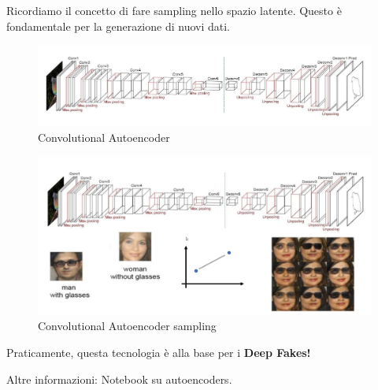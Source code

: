 Ricordiamo il concetto di fare sampling nello spazio latente. Questo è
fondamentale per la generazione di nuovi dati.

\begin{figure}[H]
    \begin{center}
        \includegraphics[scale=0.3]{images/autoencoders.png}
        \caption{Convolutional Autoencoder}
    \end{center}
\end{figure}

\begin{figure}[H]
    \begin{center}
        \includegraphics[scale=0.3]{images/autoencoders2.png}
        \caption{Convolutional Autoencoder sampling}
    \end{center}
\end{figure}

Praticamente, questa tecnologia è alla base per i \textbf{Deep Fakes!}

Altre informazioni: Notebook su autoencoders.
\newpage
